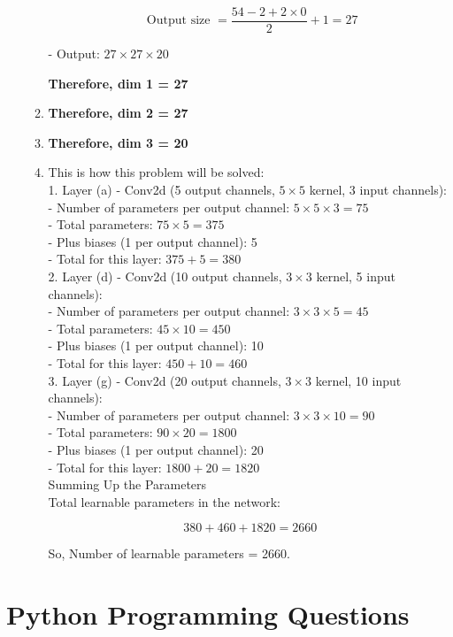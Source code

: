 \documentclass[12pt]{article}
\begin{document}
\begin{enumerate}
\begin{enumerate}
\[
\text { Output size }=\frac{54-2+2 \times 0}{2}+1=27
\]

- Output: \(27 \times 27 \times 20\) \\
\begin{tcolorbox}
  \textbf{Therefore, dim 1 = 27}  
\end{tcolorbox}
  \item \textbf{Therefore, dim 2 = 27}
  \item \textbf{Therefore, dim 3 = 20}
  \item This is how this problem will be solved: \\
  1. Layer (a) - Conv2d (5 output channels, \(5 \times 5\) kernel, 3 input channels):\\
- Number of parameters per output channel: \(5 \times 5 \times 3=75\)\\
- Total parameters: \(75 \times 5=375\)\\
- Plus biases (1 per output channel): 5\\
- Total for this layer: \(375+5=380\)\\
2. Layer (d) - Conv2d (10 output channels, \(3 \times 3\) kernel, 5 input channels):\\
- Number of parameters per output channel: \(3 \times 3 \times 5=45\)\\
- Total parameters: \(45 \times 10=450\)\\
- Plus biases (1 per output channel): 10\\
- Total for this layer: \(450+10=460\)\\
3. Layer (g) - Conv2d (20 output channels, \(3 \times 3\) kernel, 10 input channels):\\
- Number of parameters per output channel: \(3 \times 3 \times 10=90\)\\
- Total parameters: \(90 \times 20=1800\)\\
- Plus biases (1 per output channel): 20\\
- Total for this layer: \(1800+20=1820\)\\

Summing Up the Parameters\\
Total learnable parameters in the network:

\[
380+460+1820=2660
\]


So, Number of learnable parameters = 2660.
  \end{enumerate}
\end{enumerate}

\section{Python Programming Questions}
\end{document}
